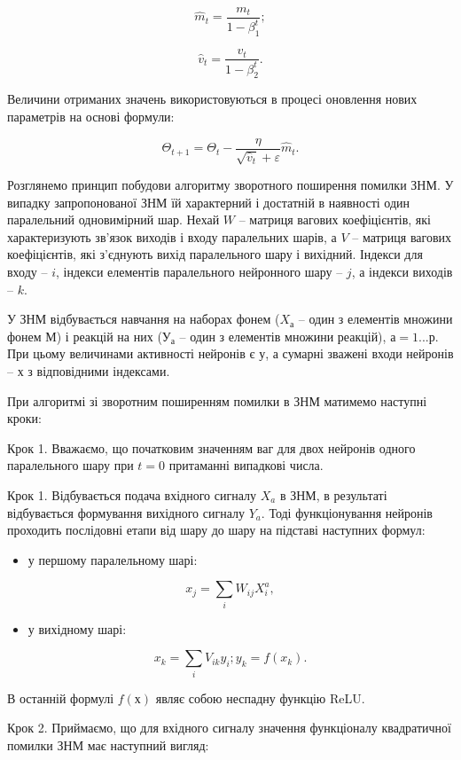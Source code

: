\[
\hat{m}_t=\frac{m_t}{1-\beta_1^t};
\]

\[
\hat{v}_t=\frac{v_t}{1-\beta_2^t}.
\]

Величини отриманих значень використовуються в процесі оновлення нових параметрів на основі формули:

\[
\Theta_{t+1}=\Theta_t-\frac{\eta}{\sqrt{\hat{v}_t}+\varepsilon}\hat{m}_t.
\]

Розглянемо принцип побудови алгоритму зворотного поширення помилки ЗНМ. У випадку запропонованої ЗНМ їй характерний і достатній в наявності один паралельний одновимірний шар. Нехай $W$ – матриця вагових коефіцієнтів, які характеризують зв’язок виходів і входу паралельних шарів, а $V$ – матриця вагових коефіцієнтів, які з’єднують вихід паралельного шару і вихідний. Індекси для входу – $i$, індекси елементів паралельного нейронного шару – $j$, а індекси виходів – $k$.

У ЗНМ відбувається навчання на наборах фонем ($X_а$ – один з елементів множини фонем $М$) і реакцій на них ($У_а$ – один з елементів множини реакцій), $а = 1...р$. При цьому величинами активності нейронів є $у$, а сумарні зважені входи нейронів – $х$ з відповідними індексами.

При алгоритмі зі зворотним поширенням помилки в ЗНМ матимемо наступні кроки:

Крок 1. Вважаємо, що початковим значенням ваг для двох нейронів одного паралельного шару при $t = 0$ притаманні випадкові числа.

Крок 1. Відбувається подача вхідного сигналу $X_a$ в ЗНМ, в результаті відбувається формування вихідного сигналу $Y_a$. Тоді функціонування нейронів проходить послідовні етапи від шару до шару на підставі наступних формул:

\begin{itemize}
	\item у першому паралельному шарі:
\end{itemize}

\[
x_j=\sum_i{W_{ij}X_i^a},
\]

\begin{itemize}
	\item у вихідному шарі:
\end{itemize}

\[
x_k=\sum_i{V_{ik}y_i}; y_k=f(x_k).
\]

В останній формулі $f(х)$ являє собою неспадну функцію ReLU.

Крок 2. Приймаємо, що для вхідного сигналу значення функціоналу квадратичної помилки ЗНМ має наступний вигляд:

